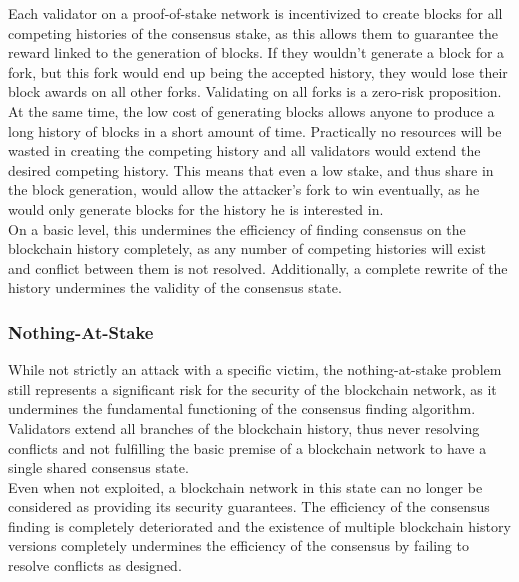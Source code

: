 \documentclass[11pt,a4paper]{article}
\begin{document}
Each validator on a proof-of-stake network is incentivized to create blocks for all competing histories of the consensus stake, as this allows them to guarantee the reward linked to the generation of blocks. If they wouldn't generate a block for a fork, but this fork would end up being the accepted history, they would lose their block awards on all other forks. Validating on all forks is a zero-risk proposition.\\

At the same time, the low cost of generating blocks allows anyone to produce a long history of blocks in a short amount of time. Practically no resources will be wasted in creating the competing history and all validators would extend the desired competing history. This means that even a low stake, and thus share in the block generation, would allow the attacker's fork to win eventually, as he would only generate blocks for the history he is interested in.\\

On a basic level, this undermines the efficiency of finding consensus on the blockchain history completely, as any number of competing histories will exist and conflict between them is not resolved. Additionally, a complete rewrite of the history undermines the validity of the consensus state.\\

\subsubsection{Nothing-At-Stake}

While not strictly an attack with a specific victim, the nothing-at-stake problem still represents a significant risk for the security of the blockchain network, as it undermines the fundamental functioning of the consensus finding algorithm. Validators extend all branches of the blockchain history, thus never resolving conflicts and not fulfilling the basic premise of a blockchain network to have a single shared consensus state.\\

Even when not exploited, a blockchain network in this state can no longer be considered as providing its security guarantees. The efficiency of the consensus finding is completely deteriorated and the existence of multiple blockchain history versions completely undermines the efficiency of the consensus by failing to resolve conflicts as designed.\\
\end{document}

